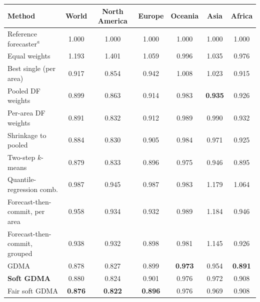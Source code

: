 \begin{tabular}{@{}lcccccc@{}}
\toprule
Method & World & North America & Europe & Oceania & Asia & Africa \\
\midrule
Reference forecaster$^a$ & 1.000 & 1.000 & 1.000 & 1.000 & 1.000 & 1.000 \\
Equal weights & 1.193 & 1.401 & 1.059 & 0.996 & 1.035 & 0.976 \\
Best single (per area) & 0.917 & 0.854 & 0.942 & 1.008 & 1.023 & 0.915 \\
Pooled DF weights & 0.899 & 0.863 & 0.914 & 0.983 & \textbf{0.935} & 0.926 \\
Per-area DF weights & 0.891 & 0.832 & 0.912 & 0.989 & 0.990 & 0.932 \\
Shrinkage to pooled & 0.884 & 0.830 & 0.905 & 0.984 & 0.971 & 0.925 \\
Two-step $k$-means & 0.879 & 0.833 & 0.896 & 0.975 & 0.946 & 0.895 \\
Quantile-regression comb. & 0.987 & 0.945 & 0.987 & 0.983 & 1.179 & 1.064 \\
Forecast-then-commit, per area & 0.958 & 0.934 & 0.932 & 0.989 & 1.184 & 0.946 \\
Forecast-then-commit, grouped & 0.938 & 0.932 & 0.898 & 0.981 & 1.145 & 0.926 \\
GDMA & 0.878 & 0.827 & 0.899 & \textbf{0.973} & 0.954 & \textbf{0.891} \\
\textbf{Soft GDMA} & 0.880 & 0.824 & 0.901 & 0.976 & 0.972 & 0.908 \\
Fair soft GDMA & \textbf{0.876} & \textbf{0.822} & \textbf{0.896} & 0.976 & 0.969 & 0.908 \\
\bottomrule
\end{tabular}